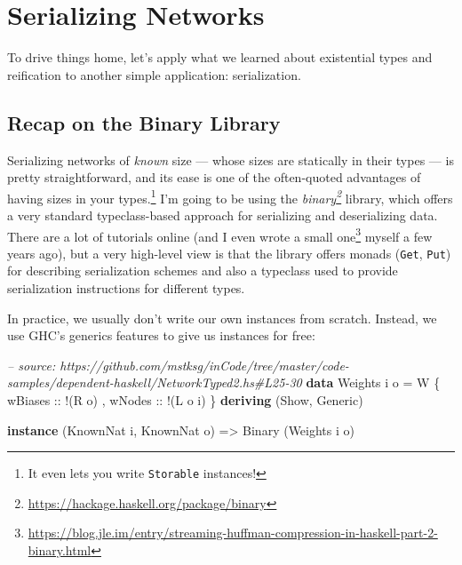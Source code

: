 \documentclass[]{article}
\newenvironment{Shaded}{\begin{snugshade}}{\end{snugshade}}
\newcommand{\CommentTok}[1]{\textcolor[rgb]{0.56,0.35,0.01}{\textit{#1}}}
\newcommand{\DataTypeTok}[1]{\textcolor[rgb]{0.13,0.29,0.53}{#1}}
\newcommand{\FunctionTok}[1]{\textcolor[rgb]{0.00,0.00,0.00}{#1}}
\newcommand{\KeywordTok}[1]{\textcolor[rgb]{0.13,0.29,0.53}{\textbf{#1}}}
\newcommand{\NormalTok}[1]{#1}
\newcommand{\OtherTok}[1]{\textcolor[rgb]{0.56,0.35,0.01}{#1}}
\renewcommand{\href}[2]{#2\footnote{\url{#1}}}
\begin{document}
\hypertarget{serializing-networks}{%
\section{Serializing Networks}\label{serializing-networks}}

To drive things home, let's apply what we learned about existential types and
reification to another simple application: serialization.

\hypertarget{recap-on-the-binary-library}{%
\subsection{Recap on the Binary Library}\label{recap-on-the-binary-library}}

Serializing networks of \emph{known} size --- whose sizes are statically in
their types --- is pretty straightforward, and its ease is one of the
often-quoted advantages of having sizes in your types.\footnote{It even lets you
  write \texttt{Storable} instances!} I'm going to be using the
\emph{\href{https://hackage.haskell.org/package/binary}{binary}} library, which
offers a very standard typeclass-based approach for serializing and
deserializing data. There are a lot of tutorials online (and I even
\href{https://blog.jle.im/entry/streaming-huffman-compression-in-haskell-part-2-binary.html}{wrote
a small one} myself a few years ago), but a very high-level view is that the
library offers monads (\texttt{Get}, \texttt{Put}) for describing serialization
schemes and also a typeclass used to provide serialization instructions for
different types.

In practice, we usually don't write our own instances from scratch. Instead, we
use GHC's generics features to give us instances for free:

\begin{Shaded}
\begin{Highlighting}[]
\CommentTok{-- source: https://github.com/mstksg/inCode/tree/master/code-samples/dependent-haskell/NetworkTyped2.hs#L25-30}
\KeywordTok{data} \DataTypeTok{Weights}\NormalTok{ i o }\FunctionTok{=} \DataTypeTok{W}\NormalTok{ \{}\OtherTok{ wBiases ::} \FunctionTok{!}\NormalTok{(}\DataTypeTok{R}\NormalTok{ o)}
\NormalTok{                     ,}\OtherTok{ wNodes  ::} \FunctionTok{!}\NormalTok{(}\DataTypeTok{L}\NormalTok{ o i)}
\NormalTok{                     \}}
  \KeywordTok{deriving}\NormalTok{ (}\DataTypeTok{Show}\NormalTok{, }\DataTypeTok{Generic}\NormalTok{)}

\KeywordTok{instance}\NormalTok{ (}\DataTypeTok{KnownNat}\NormalTok{ i, }\DataTypeTok{KnownNat}\NormalTok{ o) }\OtherTok{=>} \DataTypeTok{Binary}\NormalTok{ (}\DataTypeTok{Weights}\NormalTok{ i o)}
\end{Highlighting}
\end{Shaded}
\end{document}
